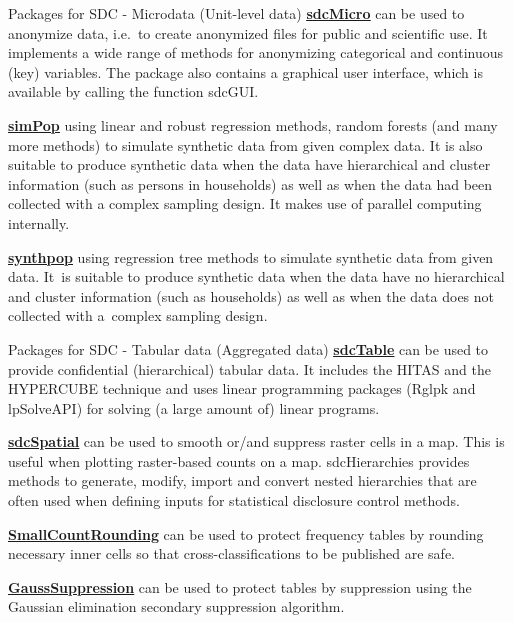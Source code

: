 \documentclass[
  ignorenonframetext,
  aspectratio=169,
]{beamer}
\begin{document}
\begin{frame}{Packages for SDC - Microdata (Unit-level data)}
\protect\hypertarget{packages-for-sdc---microdata-unit-level-data}{}
\href{https://cran.r-project.org/web/packages/sdcMicro/index.html}{\color{blue}\underline{\textbf{sdcMicro}}}
can be used to anonymize data, i.e.~to create anonymized files for
public and scientific use. It implements a wide range of methods for
anonymizing categorical and continuous (key) variables. The package also
contains a graphical user interface, which is available by calling the
function sdcGUI.

\href{https://cran.r-project.org/web/packages/simPop/index.html}{\color{blue}\underline{\textbf{simPop}}}
using linear and robust regression methods, random forests (and many
more methods) to simulate synthetic data from given complex data. It is
also suitable to produce synthetic data when the data have hierarchical
and cluster information (such as persons in households) as well as when
the data had been collected with a complex sampling design. It makes use
of parallel computing internally.

\href{https://cran.r-project.org/web/packages/synthpop/index.html}{\color{blue}\underline{\textbf{synthpop}}}
using regression tree methods to simulate synthetic data from given
data. It~is suitable to produce synthetic data when the data have no
hierarchical and cluster information (such as households) as well as
when the data does not collected with a~complex sampling design.
\end{frame}

\begin{frame}{Packages for SDC - Tabular data (Aggregated data)}
\protect\hypertarget{packages-for-sdc---tabular-data-aggregated-data}{}
\href{https://cran.r-project.org/web/packages/sdcTable/index.html}{\color{blue}\underline{\textbf{sdcTable}}}
can be used to provide confidential (hierarchical) tabular data. It
includes the HITAS and the HYPERCUBE technique and uses linear
programming packages (Rglpk and lpSolveAPI) for solving (a large amount
of) linear programs.

\href{https://cran.r-project.org/web/packages/sdcSpatial/index.html}{\color{blue}\underline{\textbf{sdcSpatial}}}
can be used to smooth or/and suppress raster cells in a map. This is
useful when plotting raster-based counts on a map. sdcHierarchies
provides methods to generate, modify, import and convert nested
hierarchies that are often used when defining inputs for statistical
disclosure control methods.

\href{https://cran.r-project.org/web/packages/SmallCountRounding/index.html}{\color{blue}\underline{\textbf{SmallCountRounding}}}
can be used to protect frequency tables by rounding necessary inner
cells so that cross-classifications to be published are safe.

\href{https://cran.r-project.org/web/packages/GaussSuppression/index.html}{\color{blue}\underline{\textbf{GaussSuppression}}}
can be used to protect tables by suppression using the Gaussian
elimination secondary suppression algorithm.
\end{frame}
\end{document}
